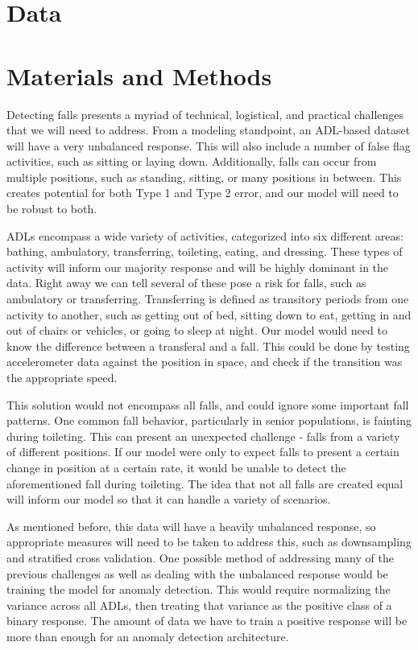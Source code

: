 \documentclass{llncs}
\begin{document}
\section{Data}
\section{Materials and Methods}
	Detecting falls presents a myriad of technical, logistical, and practical challenges that we will need to address. From a modeling standpoint, an ADL-based dataset will have a very unbalanced response. This will also include a number of false flag activities, such as sitting or laying down. Additionally, falls can occur from multiple positions, such as standing, sitting, or many positions in between. This creates potential for both Type 1 and Type 2 error, and our model will need to be robust to both.
    
    ADLs encompass a wide variety of activities, categorized into six different areas: bathing, ambulatory, transferring, toileting, eating, and dressing. These types of activity will inform our majority response and will be highly dominant in the data. Right away we can tell several of these pose a risk for falls, such as ambulatory or transferring. Transferring is defined as transitory periods from one activity to another, such as getting out of bed, sitting down to eat, getting in and out of chairs or vehicles, or going to sleep at night. Our model would need to know the difference between a transferal and a fall. This could be done by testing accelerometer data against the position in space, and check if the transition was the appropriate speed. 
    
    This solution would not encompass all falls, and could ignore some important fall patterns. One common fall behavior, particularly in senior populations, is fainting during toileting. This can present an unexpected challenge - falls from a variety of different positions. If our model were only to expect falls to present a certain change in position at a certain rate, it would be unable to detect the aforementioned fall during toileting. The idea that not all falls are created equal will inform our model so that it can handle a variety of scenarios.
    
    As mentioned before, this data will have a heavily unbalanced response, so appropriate measures will need to be taken to address this, such as downsampling and stratified cross validation. One possible method of addressing many of the previous challenges as well as dealing with the unbalanced response would be training the model for anomaly detection. This would require normalizing the variance across all ADLs, then treating that variance as the positive class of a binary response. The amount of data we have to train a positive response will be more than enough for an anomaly detection architecture.
    
\end{document}
